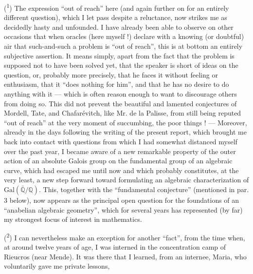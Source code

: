 
(\textsuperscript{1}) The expression ``out of reach'' here (and again further on for
an entirely different question), which I let pass despite
a reluctance, now strikes me as decidedly hasty and
unfounded. I have already been able to observe on other occasions that when
oracles (here myself !) declare with a knowing
(or doubtful) air that such-and-such a problem is ``out of reach'', this is
at bottom an entirely subjective assertion. It means
simply, apart from the fact that the problem is supposed not to have been
solved yet, that the speaker is short of ideas on the
question, or, probably more precisely, that he faces
it without feeling or enthusiasm, that it ``does nothing for him'', and
that he has no desire to do anything with it --- which
is often reason enough to want to discourage others
from doing so. This did not prevent the beautiful and lamented conjectures
of Mordell, Tate, and Chafarévitch, like Mr. de la Palisse,
from still being reputed ``out of reach'' at the very moment
of succumbing, the poor things ! --- Moreover, already in the days
following the writing of the present report, which brought me back
into contact with questions from which I had somewhat distanced myself
over the past year, I became aware of a new remarkable
property of the outer action of an absolute Galois
group on the fundamental group of an algebraic curve, which had
escaped me until now and which probably constitutes, at the very least,
a new step forward toward formulating an algebraic
characterization of $\mathrm{Gal}(\bar{\mathbb{Q}}/\mathbb{Q})$. This, together with the ``fundamental
conjecture'' (mentioned in par. 3 below), now appears as
the principal open question for the foundations of an ``anabelian
algebraic geometry'', which for several years has represented
(by far) my strongest focus of interest in mathematics.

(\textsuperscript{2}) I can nevertheless make an exception for another ``fact'', from the time
when, at around twelve years of age, I was interned in the concentration
camp of Rieucros (near Mende). It was there that I learned, from an
internee, Maria, who voluntarily gave me private lessons,

